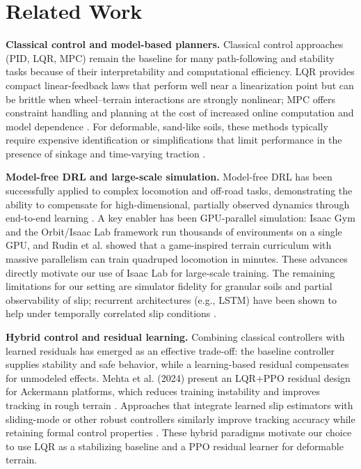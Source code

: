 \documentclass[conference]{IEEEtran}
\begin{document}
\section{Related Work}
\noindent\textbf{Classical control and model-based planners.} Classical control approaches (PID, LQR, MPC) remain the baseline for many path-following and stability tasks because of their interpretability and computational efficiency. LQR provides compact linear-feedback laws that perform well near a linearization point but can be brittle when wheel--terrain interactions are strongly nonlinear; MPC offers constraint handling and planning at the cost of increased online computation and model dependence \cite{mehta2024hybrid, zhang2023energy}. For deformable, sand-like soils, these methods typically require expensive identification or simplifications that limit performance in the presence of sinkage and time-varying traction \cite{bekker1969introduction, wong2008theory}.

\vspace{2mm}
\noindent\textbf{Model-free DRL and large-scale simulation.} Model-free DRL has been successfully applied to complex locomotion and off-road tasks, demonstrating the ability to compensate for high-dimensional, partially observed dynamics through end-to-end learning \cite{wiberg2021rough, gunma2024sac, lee2020learning}. A key enabler has been GPU-parallel simulation: Isaac Gym \cite{makoviychuk2021isaac} and the Orbit/Isaac Lab framework \cite{mittal2023orbit} run thousands of environments on a single GPU, and Rudin et al. \cite{rudin2022learning} showed that a game-inspired terrain curriculum with massive parallelism can train quadruped locomotion in minutes. These advances directly motivate our use of Isaac Lab for large-scale training. The remaining limitations for our setting are simulator fidelity for granular soils and partial observability of slip; recurrent architectures (e.g., LSTM) have been shown to help under temporally correlated slip conditions \cite{alcayaga2025lstm}.

\vspace{2mm}
\noindent\textbf{Hybrid control and residual learning.} Combining classical controllers with learned residuals has emerged as an effective trade-off: the baseline controller supplies stability and safe behavior, while a learning-based residual compensates for unmodeled effects. Mehta et al. (2024) present an LQR+PPO residual design for Ackermann platforms, which reduces training instability and improves tracking in rough terrain \cite{mehta2024hybrid}. Approaches that integrate learned slip estimators with sliding-mode or other robust controllers similarly improve tracking accuracy while retaining formal control properties \cite{nourizadeh2023sliding}. These hybrid paradigms motivate our choice to use LQR as a stabilizing baseline and a PPO residual learner for deformable terrain.
\end{document}
